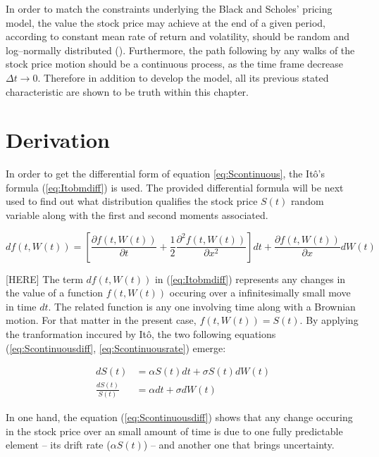 \documentclass[12pt]{report}
\newcommand{\dBm}{dW\left(t\right)}
\newcommand{\Bm}{W\left(t\right)}
\newcommand{\Dt}{\Delta t}
\newcommand{\ft}{f\left(t, \Bm \right)}
\newcommand{\St}{S\left(t\right)}
\newcommand{\dSt}{dS\left(t\right)}
\newcommand{\dSr}{\frac{\dSt}{\St}}
\newcommand{\Itobmdiff}{d\ft = \left[\frac{\partial \ft }{\partial t} + \frac{1}{2} \frac{\partial ^2\ft }{\partial x^2}\right]dt + \frac{\partial \ft}{\partial x} \dBm}
\newcommand{\Scontinousdiff}{d\St &= \alpha \St dt + \sigma \St \dBm}
\newcommand{\Scontinuousrate}{\dSr &= \alpha dt + \sigma \dBm}
\begin{document}
In order to match the constraints underlying the Black and Scholes' pricing model, the value the stock price may achieve at the end of a given period, according to constant mean rate of return and volatility, should be random and log--normally distributed (\citet{bs}).
Furthermore, the path following by any walks of the stock price motion should be  a continuous process, as the time frame decrease $\Dt \to 0$.
Therefore in addition to develop the model, all its previous stated characteristic are shown to be truth within this chapter.


\section{Derivation}
\label{sec:Derivation}

In order to get the differential form of equation \ref{eq:Scontinuous}, the Itô's formula (\ref{eq:Itobmdiff}) is used. The provided differential formula will be next used to find out what distribution qualifies the stock price $\St$ random variable along with the first and second moments associated.

\begin{center}
  \begin{equation}
    \Itobmdiff \label{eq:Itobmdiff}
  \end{equation}
\end{center}

[HERE]
The term $d\ft$ in (\ref{eq:Itobmdiff}) represents any changes in the value of a function $\ft$ occuring over a infinitesimally small move in time $dt$. The related function is any one involving time along with a Brownian motion. For that matter in the present case, $ \ft = \St $.
By applying the tranformation inccured by Itô, the two following equations (\ref{eq:Scontinuousdiff}, \ref{eq:Scontinuousrate}) emerge:
 
\begin{center}
  \begin{subequations}
    \begin{align}
      \Scontinousdiff \label{eq:Scontinuousdiff} \\
      \Scontinuousrate \label{eq:Scontinuousrate}
    \end{align}
  \end{subequations}
\end{center}

In one hand, the equation (\ref{eq:Scontinuousdiff}) shows that any change occuring in the stock price over an small amount of time is due to one fully predictable element -- its drift rate ($\alpha \St$) -- and another one that brings uncertainty.
\end{document}
